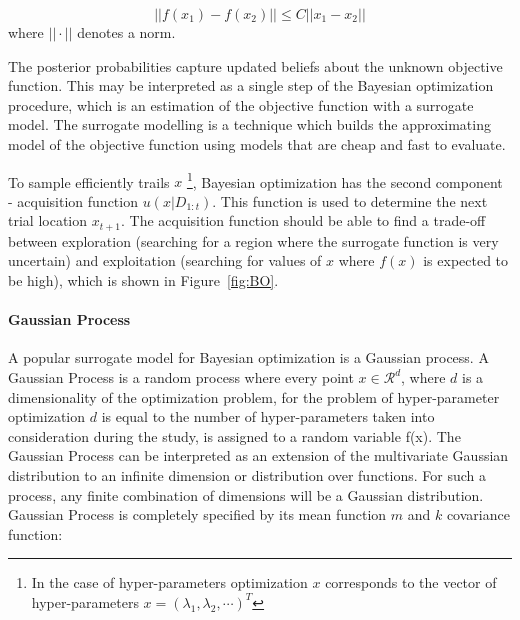 \begin{equation}
||f(x_1)-f(x_2)|| \leq C ||x_1-x_2|| 
\end{equation}
where  $||\cdot ||$ denotes a norm.


The posterior probabilities capture updated beliefs about the unknown objective function. 
This may be interpreted as a single step of the Bayesian optimization procedure, which is an estimation of the objective function with a surrogate model. The surrogate modelling is a technique which builds the approximating model of the objective function using models that are cheap and fast to evaluate. 

To sample efficiently trails $x$ \footnote{In the case of hyper-parameters optimization $x$ corresponds to the vector of hyper-parameters $x= (\lambda_1, \lambda_2, \cdots)^{T}$}, Bayesian optimization has the second component - acquisition function $u(x|D_{1:t})$. This function is used to determine the next trial location $x_{t+1}$. The acquisition function should be able to find a trade-off between exploration (searching for a region where the surrogate function is very uncertain) and exploitation (searching for values of $x$ where $f(x)$ is expected to be high), which is shown in Figure~\ref{fig:BO}. 


\paragraph{Gaussian Process} \mbox{}

A popular surrogate model for Bayesian optimization is a Gaussian process. 
A Gaussian Process is a random process where every point $x \in \mathcal{R}^{d}$, where $d$ is a dimensionality of the optimization problem, for the problem of hyper-parameter optimization $d$ is equal to the number of hyper-parameters taken into consideration during the study, 
is assigned to a random variable f(x). The Gaussian Process can be interpreted as an extension of the multivariate Gaussian distribution to an infinite dimension or distribution over functions. For such a process, any finite combination of dimensions will be a Gaussian distribution. Gaussian Process is completely specified by its mean function $m$ and $k$ covariance function: 

